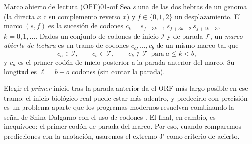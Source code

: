 \begin{definicion}{Marco abierto de lectura (ORF)}{01-orf}
Sea $s$ una de las dos hebras de un genoma (la directa $x$ o su complemento reverso $\overline{x}$) y $f\in\{0,1,2\}$ un desplazamiento. El marco $(s,f)$ es la sucesión de codones $c_k = s_{f+3k+1}\,s_{f+3k+2}\,s_{f+3k+3}$, $k=0,1,\ldots$. Dados un conjunto de codones de inicio $\mathcal{I}$ y de parada $\mathcal{T}$, un \emph{marco abierto de lectura} es un tramo de codones $c_a,\ldots,c_b$ de un mismo marco tal que
\begin{equation}\label{eq:01-orf}
c_a\in\mathcal{I},\qquad c_b\in\mathcal{T},\qquad c_k\notin\mathcal{T}\ \ \text{para}\ a\le k<b ,
\end{equation}
y $c_a$ es el primer codón de inicio posterior a la parada anterior del marco. Su longitud es $\ell=b-a$ codones (sin contar la parada).
\end{definicion}

\begin{simbolos}
\end{simbolos}

Elegir el \emph{primer} inicio tras la parada anterior da el ORF más largo posible en ese tramo; el inicio biológico real puede estar más adentro, y predecirlo con precisión es un problema aparte que los programas modernos resuelven combinando la señal de Shine-Dalgarno con el uso de codones \parencite{c01-hyatt2010}. El final, en cambio, es inequívoco: el primer codón de parada del marco. Por eso, cuando comparemos predicciones con la anotación, usaremos el extremo 3' como criterio de acierto.

